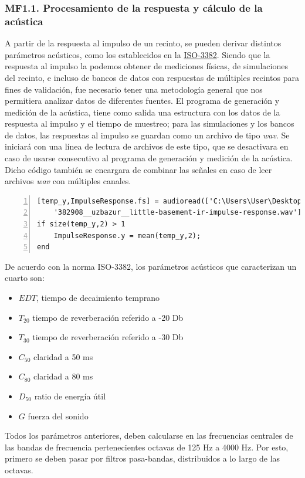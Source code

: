 \subsubsection{MF1.1. Procesamiento de la respuesta y cálculo de la acústica}

A partir de la respuesta al impulso de un recinto, se pueden derivar distintos parámetros acústicos, como los establecidos en la \href{https://www.iso.org/standard/36201.html}{ISO-3382}. Siendo que la respuesta al impulso la podemos obtener de mediciones físicas, de simulaciones del recinto, e incluso de bancos de datos con respuestas de múltiples recintos para fines de validación, fue necesario tener una metodología general que nos permitiera analizar datos de diferentes fuentes. \hfill\break
El programa de generación y medición de la acústica, tiene como salida una estructura con los datos de la respuesta al impulso y el tiempo de muestreo; para las simulaciones y los bancos de datos, las respuestas al impulso se guardan como un archivo de tipo \textit{wav}. Se iniciará con una línea de lectura de archivos de este tipo, que se desactivara en caso de usarse consecutivo al programa de generación y medición de la acústica. Dicho código también se encargara de combinar las señales en caso de leer archivos \textit{wav} con múltiples canales.
\begin{lstlisting}[frame=single,numbers=left, style=Matlab-editor, basicstyle=\tiny]
[temp_y,ImpulseResponse.fs] = audioread(['C:\Users\User\Desktop\RIR_Database\' ...
    '382908__uzbazur__little-basement-ir-impulse-response.wav']);
if size(temp_y,2) > 1
    ImpulseResponse.y = mean(temp_y,2);
end
\end{lstlisting}
De acuerdo con la norma ISO-3382, los parámetros acústicos que caracterizan un cuarto son:
\begin{itemize}
    \item $EDT$, tiempo de decaimiento temprano
    \item $T_{20}$ tiempo de reverberación referido a -20 Db
    \item $T_{30}$ tiempo de reverberación referido a -30 Db
    \item $C_{50}$ claridad a 50 ms
    \item $C_{80}$ claridad a 80 ms
    \item $D_{50}$ ratio de energía útil
    \item $G$ fuerza del sonido 
\end{itemize}
Todos los parámetros anteriores, deben calcularse en las frecuencias centrales de las bandas de frecuencia pertenecientes octavas de 125 Hz a 4000 Hz. Por esto, primero se deben pasar por filtros pasa-bandas, distribuidos a lo largo de las octavas.
